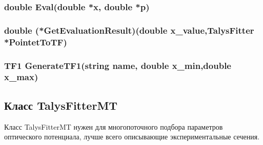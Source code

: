 \documentclass[a4paper,12pt]{extarticle}
\begin{document}
\subsubsection{double Eval(double *x, double *p)}
\subsubsection{double (*GetEvaluationResult)(double x_value,TalysFitter *PointetToTF)}
\subsubsection{TF1 GenerateTF1(string name, double x_min,double x_max)}

\subsection{Класс TalysFitterMT}
Класс TalysFitterMT нужен для многопоточного подбора параметров оптического потенциала, лучше всего описывающие экспериментальные сечения. 
\end{document}
